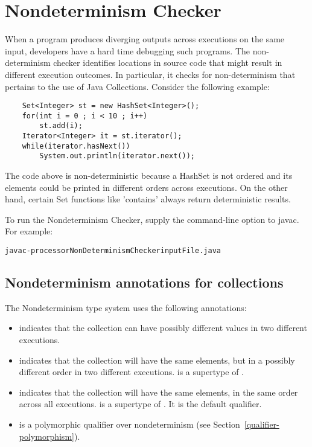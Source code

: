 \htmlhr
\chapter{Nondeterminism Checker\label{nondeterminism-checker}}
When a program produces diverging outputs across executions on the same input, developers
have a hard time debugging such programs.
The non-determinism checker identifies locations in source code that might result in different execution outcomes.
In particular, it checks for non-determinism that pertains to the use of Java Collections.
Consider the following example:
\begin{Verbatim}
	Set<Integer> st = new HashSet<Integer>();
	for(int i = 0 ; i < 10 ; i++)
	    st.add(i);
	Iterator<Integer> it = st.iterator();
	while(iterator.hasNext())
	    System.out.println(iterator.next());

\end{Verbatim}

The code above is non-deterministic because a HashSet is not ordered and its elements could be printed in different orders across executions.
On the other hand, certain Set functions like 'contains' always return deterministic results.

To run the Nondeterminism Checker, supply the
command-line option to javac.
For example:

\begin{alltt}
	javac -processor NonDeterminismChecker inputFile.java
\end{alltt}


\section{Nondeterminism annotations for collections\label{nondeterminism-annotations-collections}}

The Nondeterminism type system uses the following annotations:
\begin{itemize}
\item
   indicates
  that the collection can have possibly different values in two different executions.
\item
   indicates that
  the collection will have the same elements, but in a possibly different order in two different executions.
   is a supertype of .
 \item
   indicates that
  the collection will have the same elements, in the same order across all executions.
   is a supertype of .
   It is the default qualifier.
\item
   is a
  polymorphic qualifier over nondeterminism (see Section~\ref{qualifier-polymorphism}).
\end{itemize}

